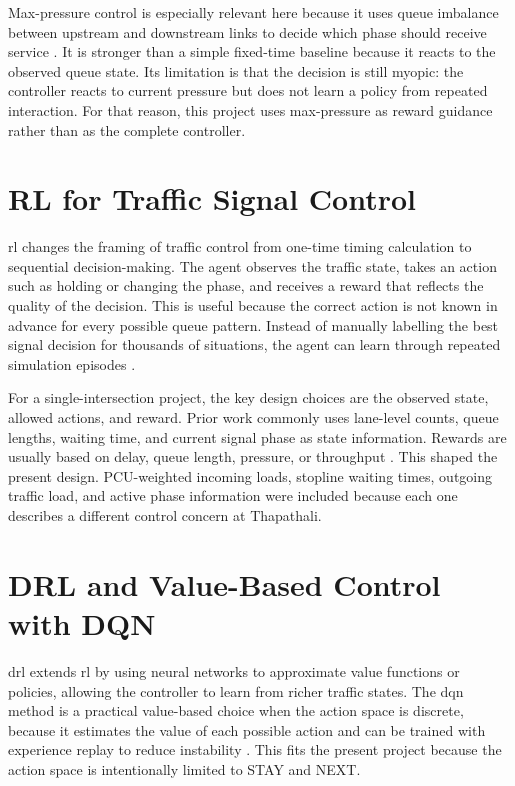 Max-pressure control is especially relevant here because it uses queue
imbalance between upstream and downstream links to decide which phase
should receive service \cite{wei2020survey}. It is stronger than a simple
fixed-time baseline because it reacts to the observed queue state. Its
limitation is that the decision is still myopic: the controller reacts to
current pressure but does not learn a policy from repeated interaction.
For that reason, this project uses max-pressure as reward guidance rather
than as the complete controller.

\section{RL for Traffic Signal Control}
\label{sec:rl_traffic_control}
\noindent \gls{rl} changes the framing of traffic control from one-time timing calculation to sequential decision-making. The agent observes the traffic state, takes an action such as holding or changing the phase, and receives a reward that reflects the quality of the decision. This is useful because the correct action is not known in advance for every possible queue pattern. Instead of manually labelling the best signal decision for thousands of situations, the agent can learn through repeated simulation episodes \cite{wei2020survey}.

For a single-intersection project, the key design choices are the
observed state, allowed actions, and reward. Prior work commonly uses
lane-level counts, queue lengths, waiting time, and current signal phase
as state information. Rewards are usually based on delay, queue length,
pressure, or throughput \cite{wei2019colight,wei2020survey}. This shaped
the present design. PCU-weighted incoming loads, stopline waiting times,
outgoing traffic load, and active phase information were included because
each one describes a different control concern at Thapathali.

\section{DRL and Value-Based Control with DQN}
\label{sec:drl_dqn_control}
\noindent \gls{drl} extends \gls{rl} by using neural networks to approximate value functions or policies, allowing the controller to learn from richer traffic states. The \gls{dqn} method is a practical value-based choice when the action space is discrete, because it estimates the value of each possible action and can be trained with experience replay to reduce instability \cite{wei2019presslight}. This fits the present project because the action space is intentionally limited to STAY and NEXT.

